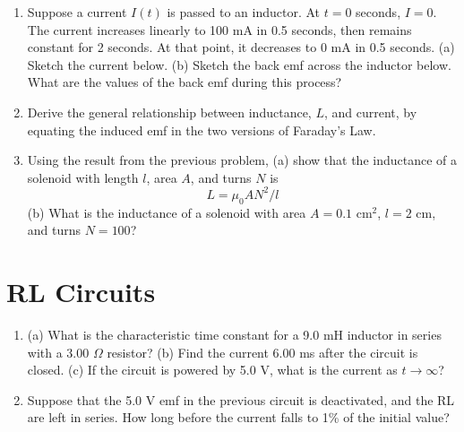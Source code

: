 \documentclass{article}
\begin{document}
\begin{enumerate}
\item Suppose a current $I(t)$ is passed to an inductor.  At $t=0$ seconds, $I=0$.  The current increases linearly to 100 mA in 0.5 seconds, then remains constant for 2 seconds.  At that point, it decreases to 0 mA in 0.5 seconds. (a) Sketch the current below.  (b) Sketch the back emf across the inductor below.  What are the values of the back emf during this process? \\ \vspace{5cm}
\item Derive the general relationship between inductance, $L$, and current, by equating the induced emf in the two versions of Faraday's Law. \\ \vspace{2cm}
\item Using the result from the previous problem, (a) show that the inductance of a solenoid with length $l$, area $A$, and turns $N$ is
\begin{equation}
L = \mu_0 A N^2/l
\end{equation}
(b) What is the inductance of a solenoid with area $A=0.1$ cm$^{2}$, $l = 2$ cm, and turns $N = 100$? \\ \vspace{4cm}
\end{enumerate}

\section{RL Circuits}

\begin{enumerate}
\item (a) What is the characteristic time constant for a 9.0 mH inductor in series with a 3.00 $\Omega$ resistor? (b) Find the current 6.00 ms after the circuit is closed. (c) If the circuit is powered by 5.0 V, what is the current as $t\to\infty$? \\ \vspace{3cm}
\item Suppose that the 5.0 V emf in the previous circuit is deactivated, and the RL are left in series.  How long before the current falls to 1\% of the initial value?
\end{enumerate}
\end{document}
